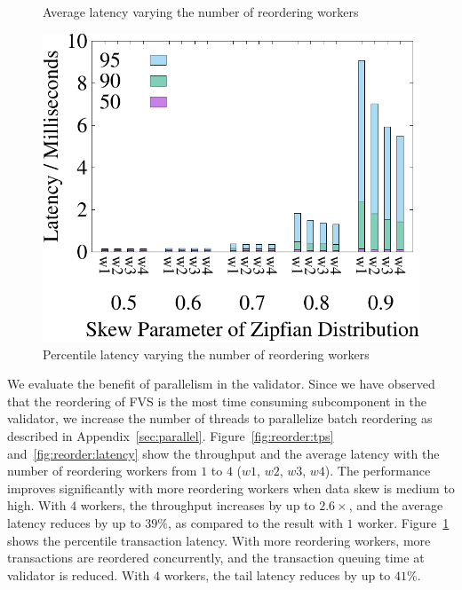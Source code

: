 \begin{figure}
\begin{minipage}[b]{0.31\linewidth}
		\caption{Average latency varying the number of reordering workers}
		\label{fig:reorder:latency}
	\end{minipage}    
	\begin{minipage}[b]{0.31\linewidth}
		\centering
		\includegraphics[width=\textwidth]{./exp_fig/reorder/percent95_latency}
		\caption{Percentile latency varying the number of reordering workers}
		\label{fig:reorder:p95}
	\end{minipage}    
\end{figure}


We evaluate the benefit of parallelism in the validator. Since we have observed that the reordering of FVS is the most time consuming subcomponent in the validator, we increase the number of threads to parallelize batch reordering as described in Appendix~\ref{sec:parallel}. 
Figure~\ref{fig:reorder:tps} and~\ref{fig:reorder:latency} show the throughput
and the average latency with the number of reordering workers from $1$ to $4$
($w1$, $w2$, $w3$, $w4$). The performance improves significantly with more reordering workers when data skew is medium to high. With $4$ workers, the throughput increases by up to $2.6\times$, and the average latency reduces by up to $39\%$, as compared to the result with $1$ worker. Figure~\ref{fig:reorder:p95} shows the percentile transaction latency. With more reordering workers, more transactions are reordered concurrently, and the transaction queuing time at validator is reduced. With $4$ workers, the tail latency reduces by up to $41\%$.

